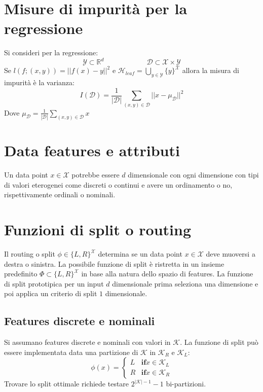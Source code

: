 \section{Misure di impurit\`a per la regressione}
Si consideri per la regressione:
	$$\mathcal{Y}\subset\mathbb{R}^d\qquad\qquad\qquad\mathcal{D}\subset\mathcal{X}\times\mathcal{Y}$$
Se $l(f;(x,y))=||f(x)-y||^2$ e $\mathcal{H}_{leaf} = \bigcup\limits_{y\in\mathcal{Y}}\{y\}^\mathcal{X}$ allora la misura di impurit\`a \`e la varianza:
$$I(\mathcal{D})=\dfrac{1}{|\mathcal{D}|}\sum\limits_{(x,y)\in\mathcal{D}}||x-\mu_\mathcal{D}||^2$$
Dove $\mu_\mathcal{D} = \frac{1}{|\mathcal{D}|}\sum\limits_{(x,y)\in\mathcal{D}}x$

\section{Data features e attributi}
Un data point $x\in\mathcal{X}$ potrebbe essere $d$ dimensionale con ogni dimensione con tipi di valori eterogenei come discreti o continui e avere un ordinamento o no, rispettivamente ordinali o nominali.

\section{Funzioni di split o routing}
Il routing o split $\phi\in\{L,R\}^{\mathcal{X}}$ determina se un data point $x\in\mathcal{X}$ deve muoversi a destra o sinistra.
La possibile funzione di split \`e ristretta in un insieme predefinito $\Phi\subset\{L,R\}^\mathcal{X}$ in base alla natura dello spazio di features.
La funzione di split prototipica per un input $d$ dimensionale prima seleziona una dimensione e poi applica un criterio di split $1$ dimensionale.

	\subsection{Features discrete e nominali}
	Si assumano features discrete e nominali con valori in $\mathcal{K}$.
	La funzione di split pu\`o essere implementata data una partizione di $\mathcal{K}$ in $\mathcal{K}_R$ e $\mathcal{K}_L$:
	$$\phi(x) = \begin{cases}L &\mathbf{if} x\in\mathcal{K}_L\\
		 								  R &\mathbf{if} x\in\mathcal{K}_R
				 \end{cases}$$
	Trovare lo split ottimale richiede testare $2^{|\mathcal{K}|-1}-1$ bi-partizioni.

